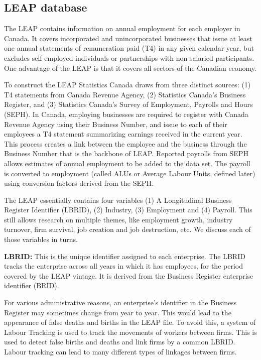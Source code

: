 
\subsection{LEAP database}

The LEAP contains information on annual employment for each employer in Canada. It covers incorporated and unincorporated businesses that issue at least one annual statements of remuneration paid (T4) in any given calendar year, but excludes self-employed individuals or partnerships with non-salaried participants. One advantage of the LEAP is that it covers all sectors of the Canadian economy.

To construct the LEAP Statistics Canada draws from three distinct sources: (1) T4 statements from Canada Revenue Agency, (2) Statistics Canada's Business Register, and (3) Statistics Canada's Survey of Employment, Payrolls and Hours (SEPH). In Canada, employing businesses are required to register with Canada Revenue Agency using their Business Number, and issue to each of their employees a T4 statement summarizing earnings received in the current year. This process creates a link between the employee and the business through the Business Number that is the backbone of LEAP. Reported payrolls from SEPH allows estimates of annual employment to be added to the data set. The payroll is converted to employment (called ALUs or Average Labour Units, defined later) using conversion factors derived from the SEPH. 

The LEAP essentially contains four variables (1) A Longitudinal Business Register Identifier (LBRID), (2) Industry, (3) Employment and (4) Payroll. This still allows research on multiple themes, like employment growth, industry turnover, firm survival, job creation and job destruction, etc. We discuss each of those variables in turns. 

\textbf{LBRID:} This is the unique identifier assigned to each enterprise.  The LBRID tracks the enterprise across all years in which it has employees, for the period covered by the LEAP vintage. It is derived from the Business Register enterprise identifier (BRID). 

For various administrative reasons, an enterprise's identifier in the Business Register may sometimes change from year to year.  This would lead to the appearance of false deaths and births in the LEAP file.  To avoid this, a system of Labour Tracking is used to track the movements of workers between firms.  This is used to detect false births and deaths and link firms by a common LBRID. Labour tracking can lead to many different types of linkages between firms. 

